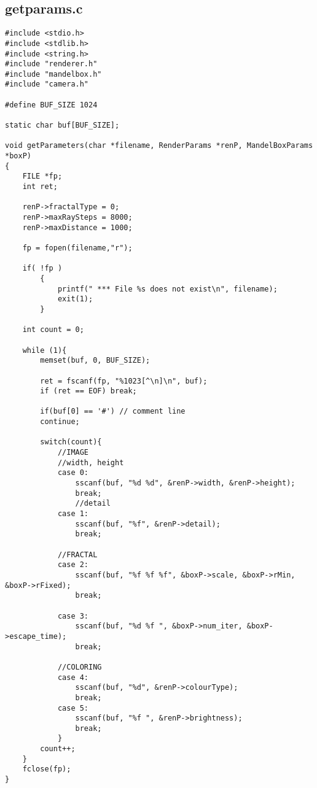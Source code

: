 \documentclass[]{article}
\begin{document}
\subsection{getparams.c}
\begin{Verbatim}[fontsize= \footnotesize, tabsize=4]
#include <stdio.h>
#include <stdlib.h>
#include <string.h>
#include "renderer.h"
#include "mandelbox.h"
#include "camera.h"

#define BUF_SIZE 1024

static char buf[BUF_SIZE];

void getParameters(char *filename, RenderParams *renP, MandelBoxParams *boxP)
{
	FILE *fp;
	int ret;

	renP->fractalType = 0;
	renP->maxRaySteps = 8000;
	renP->maxDistance = 1000;

	fp = fopen(filename,"r");

	if( !fp )
		{
			printf(" *** File %s does not exist\n", filename);
			exit(1);
		}

	int count = 0;

	while (1){
		memset(buf, 0, BUF_SIZE);

		ret = fscanf(fp, "%1023[^\n]\n", buf);
		if (ret == EOF) break;

		if(buf[0] == '#') // comment line
		continue;

		switch(count){
			//IMAGE
			//width, height
			case 0:
				sscanf(buf, "%d %d", &renP->width, &renP->height);
				break;
				//detail
			case 1:
				sscanf(buf, "%f", &renP->detail);
				break;

			//FRACTAL
			case 2:
				sscanf(buf, "%f %f %f", &boxP->scale, &boxP->rMin, &boxP->rFixed);
				break;

			case 3:
				sscanf(buf, "%d %f ", &boxP->num_iter, &boxP->escape_time);
				break;

			//COLORING
			case 4:
				sscanf(buf, "%d", &renP->colourType);
				break;
			case 5:
				sscanf(buf, "%f ", &renP->brightness);
				break;
			}
		count++;
	}
	fclose(fp);
}
\end{Verbatim}
\end{document}
